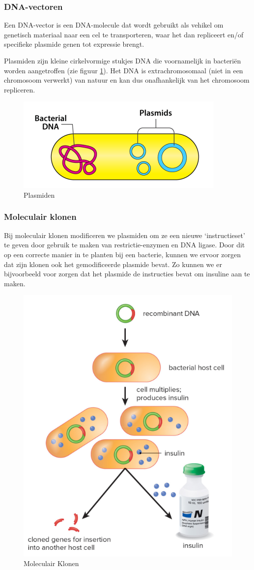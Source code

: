 \documentclass[a4paper,kul]{kulakarticle} %
\begin{document}
\subsubsection{DNA-vectoren}
Een DNA-vector is een DNA-molecule dat wordt gebruikt als vehikel om genetisch materiaal naar een cel te transporteren, waar het dan repliceert en/of specifieke plasmide genen tot expressie brengt. 

Plasmiden zijn kleine cirkelvormige stukjes DNA die voornamelijk in bacteriën worden aangetroffen (zie figuur \ref{fig:plasmiden}). Het DNA is extrachromosomaal (niet in een chromosoom verwerkt) van natuur en kan dus onafhankelijk van het chromosoom repliceren. 
\begin{figure}[h]
	\centering
	\includegraphics[width=0.5\linewidth]{Plasmiden}
	\caption[Plasmids]{Plasmiden}
	\label{fig:plasmiden}
\end{figure}
\newpage
\subsubsection{Moleculair klonen}
Bij moleculair klonen modificeren we plasmiden om ze een nieuwe `instructieset' te geven door gebruik te maken van restrictie-enzymen en DNA ligase. Door dit op een correcte manier in te planten bij een bacterie, kunnen we ervoor zorgen dat zijn klonen ook het gemodificeerde plasmide bevat. Zo kunnen we er bijvoorbeeld voor zorgen dat het plasmide de instructies bevat om insuline aan te maken. 
\begin{figure}[h]
	\centering
	\includegraphics[width=0.4\linewidth]{MoleculairKlonen}
	\caption[Moleculair klonen]{Moleculair Klonen}
	\label{fig:moleculairklonen}
\end{figure}
\end{document}
